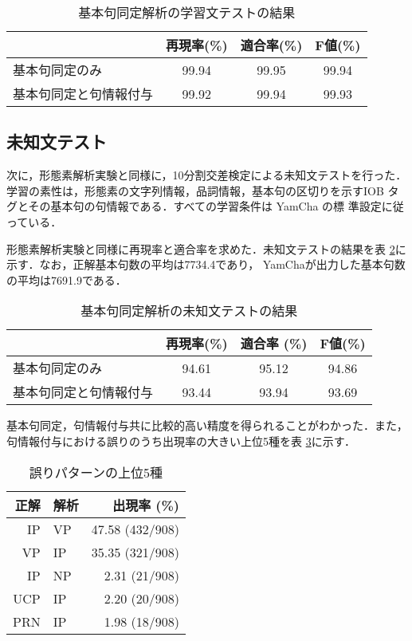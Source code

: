 \begin{table}[htb]
 \begin{center}
\caption{基本句同定解析の学習文テストの結果}
\label{BP_close}
  \begin{tabular}{l|ccc}
\hline
                        & 再現率(\%)& 適合率(\%) & F値(\%)\\
\hline
 基本句同定のみ         & 99.94 & 99.95 & 99.94\\
 基本句同定と句情報付与 & 99.92 & 99.94 & 99.93\\
\hline
  \end{tabular}
 \end{center}
\end{table}


\subsection{未知文テスト}

次に，形態素解析実験と同様に，10分割交差検定による未知文テストを行った．
学習の素性は，形態素の文字列情報，品詞情報，基本句の区切りを示すIOB 
タグとその基本句の句情報である．すべての学習条件は YamCha の標
準設定に従っている．

形態素解析実験と同様に再現率と適合率を求めた．未知文テストの結果を表
\ref{BphopenResult1}に示す．なお，正解基本句数の平均は7734.4であり，
YamChaが出力した基本句数の平均は7691.9である．


\begin{table}[htb]
  \begin{center}
   \caption{基本句同定解析の未知文テストの結果}
   \begin{tabular}{l|ccc}
\hline
                         & 再現率(\%) & 適合率 (\%) & F値(\%)\\ 
\hline
  基本句同定のみ         &  94.61 & 95.12 & 94.86\\
  基本句同定と句情報付与 &  93.44 & 93.94 & 93.69\\ 
\hline
   \end{tabular}
   \label{BphopenResult1}
  \end{center}
\end{table}

基本句同定，句情報付与共に比較的高い精度を得られることがわかった．また，
句情報付与における誤りのうち出現率の大きい上位5種を表
\ref{BphopenResult2}に示す．

\begin{table}[htb]
  \begin{center}
   \caption{誤りパターンの上位5種}
   \begin{tabular}{r@{ - }l|r}  \hline
    正解 & 解析 & 出現率 (\%)\\ \hline
     IP  &  VP  & 47.58 (432/908)    \\
     VP  &  IP  & 35.35 (321/908)  \\
     IP  &  NP  & 2.31  (21/908)  \\
     UCP  & IP  & 2.20 (20/908)   \\
     PRN  & IP  & 1.98 (18/908)   \\ \hline
   \end{tabular}
   \label{BphopenResult2}
  \end{center}
\end{table}

